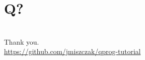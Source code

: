 \documentclass{beamer}
\begin{document}
\section{Q?}
\begin{frame}{\insertsection}
    \begin{center}
        \Huge {\color{iitis-orange} \insertsection}\\[12pt]
        \LARGE Thank you.\\[12pt]
        \large \url{https://github.com/jmiszczak/qprog-tutorial}
    \end{center}
\end{frame}
\end{document}
